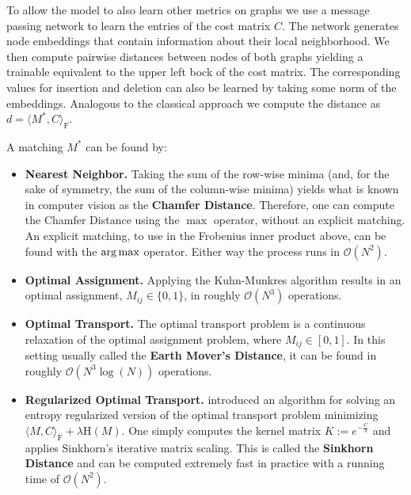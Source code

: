 To allow the model to also learn other metrics on graphs we use a message passing network to learn the entries of the cost matrix $C$. The network generates node embeddings that contain information about their local neighborhood. We then compute pairwise distances between nodes of both graphs yielding a trainable equivalent to the upper left bock of the cost matrix. The corresponding values for insertion and deletion can also be learned by taking some norm of the embeddings. Analogous to the classical approach we compute the distance as $ d = \langle M^*, C \rangle_\mathrm{F} $.

A matching $M^*$ can be found by:
\begin{itemize}
     \itemsep0em
     \item \textbf{Nearest Neighbor.} Taking the sum of the row-wise minima (and, for the sake of symmetry, the sum of the column-wise minima) yields what is known in computer vision as the \textbf{Chamfer Distance}. Therefore, one can compute the Chamfer Distance using the $\max$ operator, without an explicit matching. An explicit matching, to use in the Frobenius inner product above, can be found with the $\operatorname*{arg\,max}$ operator. Either way the process runs in $\mathcal{O}(N^2)$.
     \item \textbf{Optimal Assignment.} Applying the Kuhn-Munkres algorithm results in an optimal assignment, $M_{ij} \in \{0,1\}$, in roughly $\mathcal{O}(N^3)$ operations.
     \item \textbf{Optimal Transport.} The optimal transport problem is a continuous relaxation of the optimal assignment problem, where $M_{ij} \in \left[ 0,1 \right]$. In this setting usually called the \textbf{Earth Mover's Distance}, it can be found in roughly $\mathcal{O}(N^3 \log(N))$ operations.
     \item \textbf{Regularized Optimal Transport.} \cite{sinkhorn2013} introduced an algorithm for solving an entropy regularized version of the optimal transport problem minimizing $\langle M, C \rangle_\mathrm{F} + \lambda \mathrm{H}(M)$. One simply computes the kernel matrix $ K := e^{-\frac{C}{\lambda}}$ and applies Sinkhorn’s iterative matrix scaling. This is called the \textbf{Sinkhorn Distance} and can be computed extremely fast in practice with a running time of $\mathcal{O}(N^2)$.
\end{itemize}


